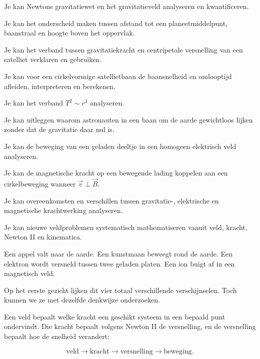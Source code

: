 \documentclass{ximera}
\begin{document}
\begin{leerdoelen}
  \item Je kan Newtons gravitatiewet en het gravitatieveld analyseren en
        kwantificeren.
  \item Je kan het onderscheid maken tussen afstand tot een
        planeetmiddelpunt, baanstraal en hoogte boven het oppervlak.
  \item Je kan het verband tussen gravitatiekracht en centripetale
        versnelling van een satelliet verklaren en gebruiken.
  \item Je kan voor een cirkelvormige satellietbaan de baansnelheid en
        omlooptijd afleiden, interpreteren en berekenen.
  \item Je kan het verband $T^2\sim r^3$ analyseren.
  \item Je kan uitleggen waarom astronauten in een baan om de aarde
        gewichtloos lijken zonder dat de gravitatie daar nul is.
  \item Je kan de beweging van een geladen deeltje in een homogeen
        elektrisch veld analyseren.
  \item Je kan de magnetische kracht op een bewegende lading koppelen aan
        een cirkelbeweging wanneer $\vec v\perp\vec B$.
  \item Je kan overeenkomsten en verschillen tussen gravitatie-, elektrische
        en magnetische krachtwerking analyseren.
  \item Je kan nieuwe veldproblemen systematisch mathematiseren vanuit
        veld, kracht, Newton II en kinematica.
\end{leerdoelen}




Een appel valt naar de aarde. Een kunstmaan beweegt rond de aarde.
Een elektron wordt versneld tussen twee geladen platen. Een ion buigt
af in een magnetisch veld.

Op het eerste gezicht lijken dit vier totaal verschillende verschijnselen.
Toch kunnen we ze met dezelfde denkwijze onderzoeken.

Een veld bepaalt welke kracht een geschikt systeem in een bepaald punt
ondervindt. Die kracht bepaalt volgens Newton II de versnelling, en de
versnelling bepaalt hoe de snelheid verandert:

\[
\boxed{
\text{veld}
\longrightarrow
\text{kracht}
\longrightarrow
\text{versnelling}
\longrightarrow
\text{beweging}.
}
\]
\end{document}
